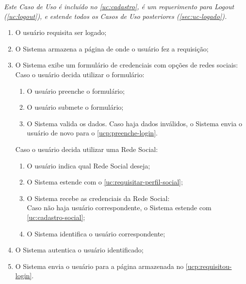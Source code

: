 \documentclass[12pt,a4paper,twoside,hyphens,english,brazil]{abntex2}
\begin{document}
{%
\emph{Este Caso de Uso é incluído no \ref{uc:cadastro}, é um requerimento para Logout (\ref{uc:logout}), e estende todos os Casos de Uso posteriores (\ref{sec:uc-logado}).}
\begin{enumerate}[itemsep=-1ex,topsep=-1ex]
	\item O usuário requisita ser logado;
	\item O Sistema armazena a página de onde o usuário fez a requisição; \label{ucp:requisitou-login}
	\item O Sistema exibe um formulário de credenciais com opções de redes sociais: \label{ucp:preenche-login}
		\\Caso o usuário decida utilizar o formulário:
			\begin{enumerate}[itemsep=-1ex,topsep=-1ex]
				\item O usuário preenche o formulário;
				\item O usuário submete o formulário;
				\item O Sistema valida os dados. Caso haja dados inválidos, o Sistema envia o usuário de novo para o \autoref{ucp:preenche-login}.
			\end{enumerate}
		Caso o usuário decida utilizar uma Rede Social:
			\begin{enumerate}[itemsep=-1ex,topsep=-1ex]
				\item O usuário indica qual Rede Social deseja;
				\item O Sistema estende com o \ref{uc:requisitar-perfil-social};
				\item O Sistema recebe as credenciais da Rede Social:
					\\Caso não haja usuário correspondente, o Sistema estende com \ref{uc:cadastro-social};
				\item O Sistema identifica o usuário correspondente;
			\end{enumerate}
	\item O Sistema autentica o usuário identificado;
	\item O Sistema envia o usuário para a página armazenada no \autoref{ucp:requisitou-login}.
\end{enumerate}

}
\end{document}

